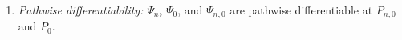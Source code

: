\documentclass[11pt]{article}
\theoremstyle{definition}
\begin{document}


 
 



\begin{enumerate}[label=A\arabic*), ref=A\arabic*, resume = cond]%
\item \textit{Pathwise differentiability:} $\Psi_n$, $\Psi_0$, and $\Psi_{n,0}$ are pathwise differentiable at $P_{n,0}$ and $P_0$. \label{cond::oracleProjInModelFinal}
\end{enumerate}
 
\end{document}
